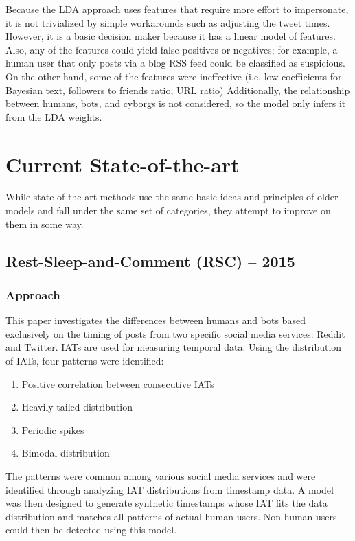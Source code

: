 \documentclass[11pt, oneside]{article}   	%
\begin{document}
\quad Because the LDA approach uses features that require more effort to impersonate, it is not trivialized by simple workarounds such as adjusting the tweet times.
However, it is a basic decision maker because it has a linear model of features.
Also, any of the features could yield false positives or negatives; for example, a human user that only posts via a blog RSS feed could be classified as suspicious.
On the other hand, some of the features were ineffective (i.e. low coefficients for Bayesian text, followers to friends ratio, URL ratio)
Additionally, the relationship between humans, bots, and cyborgs is not considered, so the model only infers it from the LDA weights.

\section*{Current State-of-the-art}

\quad While state-of-the-art methods use the same basic ideas and principles of older models and fall under the same set of categories, they attempt to improve on them in some way.

\subsection*{Rest-Sleep-and-Comment (RSC) -- 2015}

\subsubsection*{Approach}

\quad This paper investigates the differences between humans and bots based exclusively on the timing of posts from two specific social media services: Reddit and Twitter. \cite{rsc}
IATs are used for measuring temporal data.
Using the distribution of IATs, four patterns were identified:
\begin{enumerate}
	\item Positive correlation between consecutive IATs
	\item Heavily-tailed distribution
	\item Periodic spikes
	\item Bimodal distribution
\end{enumerate}
\quad The patterns were common among various social media services and were identified through analyzing IAT distributions from timestamp data.
A model was then designed to generate synthetic timestamps whose IAT fits the data distribution and matches all patterns of actual human users.
Non-human users could then be detected using this model.
\end{document}
